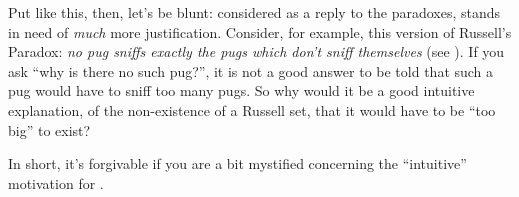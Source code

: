\documentclass[../../../include/open-logic-section]{subfiles}
\begin{document}
Put like this, then, let's be blunt: considered as a reply to the
paradoxes, \limofsize{} stands in need of \emph{much} more
justification. Consider, for example, this version of Russell's
Paradox: \emph{no pug sniffs exactly the pugs which don't sniff
themselves} (see ). If you ask ``why is there no such pug?'', it is not a
good answer to be told that such a pug would have to sniff too many
pugs. So why would it be a good intuitive explanation, of the
non-existence of a Russell set, that it would have to be ``too big''
to exist? 

In short, it's forgivable if you are a bit mystified concerning the ``intuitive''
motivation for \limofsize. 
\end{document}
